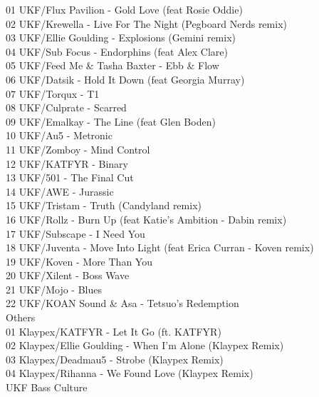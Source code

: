 \begin{multicols}{2}
 01 UKF/Flux Pavilion - Gold Love (feat Rosie Oddie)\\ 02 UKF/Krewella - Live For The Night (Pegboard Nerds remix)\\ 03 UKF/Ellie Goulding - Explosions (Gemini remix)\\ 04 UKF/Sub Focus - Endorphins (feat Alex Clare)\\ 05 UKF/Feed Me \& Tasha Baxter - Ebb \& Flow\\ 06 UKF/Datsik - Hold It Down (feat Georgia Murray)\\ 07 UKF/Torqux - T1\\ 08 UKF/Culprate - Scarred\\ 09 UKF/Emalkay - The Line (feat Glen Boden)\\ 10 UKF/Au5 - Metronic\\ 11 UKF/Zomboy - Mind Control\\ 12 UKF/KATFYR - Binary\\ 13 UKF/501 - The Final Cut\\ 14 UKF/AWE - Jurassic\\ 15 UKF/Tristam - Truth (Candyland remix)\\ 16 UKF/Rollz - Burn Up (feat Katie's Ambition - Dabin remix)\\ 17 UKF/Subscape - I Need You\\ 18 UKF/Juventa - Move Into Light (feat Erica Curran - Koven remix)\\ 19 UKF/Koven - More Than You\\ 20 UKF/Xilent - Boss Wave\\ 21 UKF/Mojo - Blues\\ 22 UKF/KOAN Sound \& Asa - Tetsuo's Redemption\\
 \large Others \normalsize\\
 01 Klaypex/KATFYR - Let It Go (ft. KATFYR)\\ 02 Klaypex/Ellie Goulding - When I'm Alone (Klaypex Remix)\\ 03 Klaypex/Deadmau5 - Strobe (Klaypex Remix)\\ 04 Klaypex/Rihanna - We Found Love (Klaypex Remix)\\
 \large UKF Bass Culture \normalsize\\

\end{multicols}
